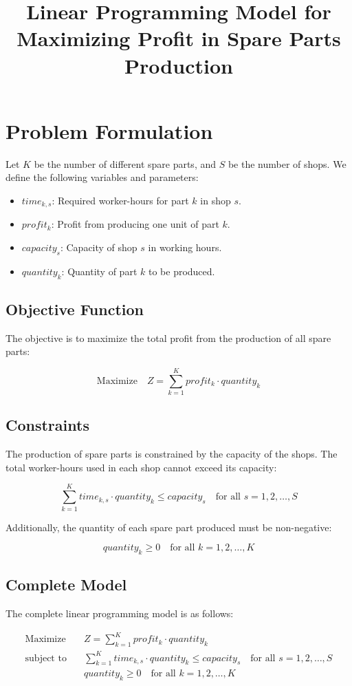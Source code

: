 \documentclass{article}
\begin{document}
\title{Linear Programming Model for Maximizing Profit in Spare Parts Production}
\author{}
\date{}
\maketitle

\section*{Problem Formulation}

Let \( K \) be the number of different spare parts, and \( S \) be the number of shops. We define the following variables and parameters:

\begin{itemize}
    \item \( time_{k,s} \): Required worker-hours for part \( k \) in shop \( s \).
    \item \( profit_{k} \): Profit from producing one unit of part \( k \).
    \item \( capacity_{s} \): Capacity of shop \( s \) in working hours.
    \item \( quantity_{k} \): Quantity of part \( k \) to be produced.
\end{itemize}

\subsection*{Objective Function}
The objective is to maximize the total profit from the production of all spare parts:

\[
\text{Maximize} \quad Z = \sum_{k=1}^{K} profit_{k} \cdot quantity_{k}
\]

\subsection*{Constraints}
The production of spare parts is constrained by the capacity of the shops. The total worker-hours used in each shop cannot exceed its capacity:

\[
\sum_{k=1}^{K} time_{k,s} \cdot quantity_{k} \leq capacity_{s} \quad \text{for all } s = 1, 2, \ldots, S
\]

Additionally, the quantity of each spare part produced must be non-negative:

\[
quantity_{k} \geq 0 \quad \text{for all } k = 1, 2, \ldots, K
\]

\subsection*{Complete Model}
The complete linear programming model is as follows:

\[
\begin{align*}
\text{Maximize} \quad & Z = \sum_{k=1}^{K} profit_{k} \cdot quantity_{k} \\
\text{subject to} \quad & \sum_{k=1}^{K} time_{k,s} \cdot quantity_{k} \leq capacity_{s} \quad \text{for all } s = 1, 2, \ldots, S \\
& quantity_{k} \geq 0 \quad \text{for all } k = 1, 2, \ldots, K
\end{align*}
\]
\end{document}

